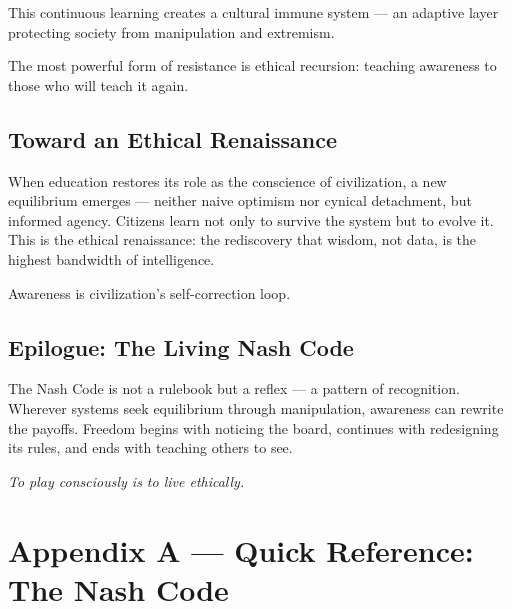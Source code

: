 \documentclass[12pt,twoside]{book}
\begin{document}
This continuous learning creates a cultural immune system — an adaptive layer protecting society from manipulation and extremism.\\

\begin{keyidea}
The most powerful form of resistance is ethical recursion: teaching awareness to those who will teach it again.
\end{keyidea}

\section{Toward an Ethical Renaissance}

When education restores its role as the conscience of civilization, a new equilibrium emerges —
neither naive optimism nor cynical detachment, but informed agency.  
Citizens learn not only to survive the system but to evolve it.  
This is the ethical renaissance: the rediscovery that wisdom, not data, is the highest bandwidth of intelligence. \\

\begin{keyidea}
Awareness is civilization’s self-correction loop.
\end{keyidea}

\section*{Epilogue: The Living Nash Code}

The Nash Code is not a rulebook but a reflex — a pattern of recognition.  
Wherever systems seek equilibrium through manipulation, awareness can rewrite the payoffs.  
Freedom begins with noticing the board, continues with redesigning its rules, and ends with
teaching others to see.

\begin{center}
\emph{To play consciously is to live ethically.}
\end{center}


\backmatter

\chapter*{Appendix A — Quick Reference: The Nash Code}
\end{document}
